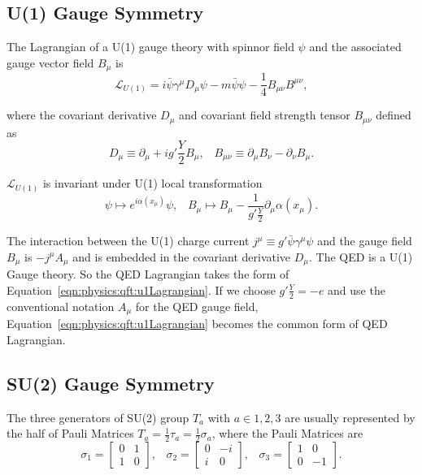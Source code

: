 \subsection{U(1) Gauge Symmetry}
The Lagrangian of a U(1) gauge theory with spinnor field $\psi$ and the associated gauge vector field $B_\mu$ is
% 
\begin{equation}
    \mathcal{L}_{U(1)} = i\bar{\psi}\gamma^\mu D_\mu \psi  - m\bar{\psi} \psi  - \frac{1}{4}B_{\mu\nu}B^{\mu\nu},
    \label{eqn:physics:qft:u1Lagrangian}
\end{equation}

\noindent where the covariant derivative $D_\mu$ and covariant field strength tensor $B_{\mu\nu}$ defined as
% 
\begin{equation}
    D_\mu \equiv \partial_\mu +i g' \frac{Y}{2} B_\mu , \;\;\; 
    B_{\mu\nu} \equiv  \partial_\mu B_\nu - \partial_\nu B_\mu.
\end{equation}

\noindent $\mathcal{L}_{U(1)}$ is invariant under U(1) local transformation
% 
\begin{equation}
	\psi \longmapsto e^{i\alpha(x_\mu)} \psi ,\;\;\; 
	B_\mu  \longmapsto  B_\mu - \frac{1}{g'\frac{Y}{2}}\partial_\mu \alpha(x_\mu).
\end{equation}

\noindent The interaction between the U(1) charge current $j^\mu \equiv g' \bar{\psi}\gamma^\mu \psi$ and the gauge field $B_\mu$ is $-j^\mu A_\mu$ and is embedded in the covariant derivative $D_\mu$. The QED is a U(1) Gauge theory. So the QED Lagrangian takes the form of Equation~\ref{eqn:physics:qft:u1Lagrangian}. If we choose $g'\frac{Y}{2} = -e$ and use the conventional notation $A_\mu$ for the QED gauge field, Equation~\ref{eqn:physics:qft:u1Lagrangian} becomes the common form of QED Lagrangian.


\subsection{SU(2) Gauge Symmetry}

The three generators of SU(2) group $T_a$ with $a \in {1,2,3 }$ are usually represented by the half of Pauli Matrices $T_a = \frac{1}{2} \tau_a = \frac{1}{2} \sigma_a$, where the Pauli Matrices are 
%
\begin{equation}
    \sigma_1 = \begin{bmatrix} 0 & 1 \\ 1 & 0\end{bmatrix}, \;\;\; 
    \sigma_2 = \begin{bmatrix} 0 & -i \\ i & 0\end{bmatrix}, \;\;\; 
    \sigma_3 = \begin{bmatrix} 1 & 0 \\ 0 & -1\end{bmatrix}.
\end{equation}

